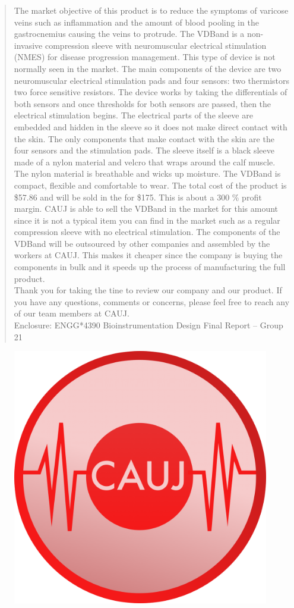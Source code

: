 \documentclass[11.5pt]{article}
\begin{document}
\begin{abstract}
The market objective of this product is to reduce the symptoms of varicose veins such as inflammation and the amount of blood pooling in the gastrocnemius causing the veins to protrude. The VDBand is a non-invasive compression sleeve with neuromuscular electrical stimulation (NMES) for disease progression management. This type of device is not normally seen in the market. The main components of the device are two neuromuscular electrical stimulation pads and four sensors: two thermistors two force sensitive resistors. The device works by taking the differentials of both sensors and once thresholds for both sensors are passed, then the electrical stimulation begins. The electrical parts of the sleeve are embedded and hidden in the sleeve so it does not make direct contact with the skin. The only components that make contact with the skin are the four sensors and the stimulation pads. The sleeve itself is a black sleeve made of a nylon material and velcro that wraps around the calf muscle. The nylon material is breathable and wicks up moisture. The VDBand is compact, flexible and comfortable to wear. The total cost of the product is \$57.86 and will be sold in the for \$175. This is about a 300 \% profit margin. CAUJ is able to sell the VDBand in the market for this amount since it is not a typical item you can find in the market such as a regular compression sleeve with no electrical stimulation. The components of the VDBand will be outsourced by other companies and assembled by the workers at CAUJ. This makes it cheaper since the company is buying the components in bulk and it speeds up the process of manufacturing the full product. \\

Thank you for taking the tine to review our company and our product. If you have any questions, comments or concerns, please feel free to reach any of our team members at CAUJ.\\


Enclosure: ENGG*4390 Bioinstrumentation Design Final Report – Group 21


\end{abstract}

\pagebreak
\begin{titlepage}
    \centering
    \maketitle
    \begin{figure}[H]
    \centering
    \includegraphics[width=0.25\linewidth]{titlepage/CAUJ.png}
    \end{figure}
    \thispagestyle{empty}
\end{titlepage}
\end{document}
